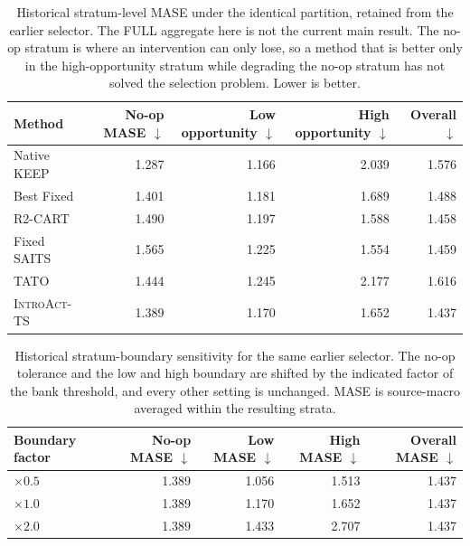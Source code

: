\documentclass{article}
\newcommand{\introact}{\textsc{IntroAct-TS}}
\begin{document}
\begin{table}[htbp]
  \caption{Historical stratum-level MASE under the identical partition, retained from the earlier selector. The FULL aggregate here is not the current main result. The no-op stratum is where an
  intervention can only lose, so a method that is better only in the high-opportunity stratum
  while degrading the no-op stratum has not solved the selection problem. Lower is better.}
  \label{tab:app-opportunity}
  \centering
  \small
  \setlength{\tabcolsep}{4pt}
\begin{tabular*}{\textwidth}{@{\extracolsep{\fill}}lrrrr@{}}
    \toprule
    Method & No-op MASE $\downarrow$ & Low opportunity $\downarrow$ & High opportunity $\downarrow$ & Overall $\downarrow$ \\
    \midrule
    Native KEEP        & 1.287    & 1.166    & 2.039    & 1.576 \\
    Best Fixed         & 1.401      & 1.181      & 1.689      & 1.488 \\
    R2-CART            & 1.490      & 1.197      & 1.588      & 1.458 \\
    Fixed SAITS           & 1.565      & 1.225      & 1.554      & 1.459 \\
    TATO               & 1.444    & 1.245    & 2.177    & 1.616 \\
    \midrule
    \rowcolor{bestgray}\introact{} & 1.389 & 1.170 & 1.652 & 1.437 \\
    \bottomrule
  \end{tabular*}
\end{table}

\begin{table}[htbp]
  \caption{Historical stratum-boundary sensitivity for the same earlier selector. The no-op tolerance and the low and high boundary are
  shifted by the indicated factor of the bank threshold, and every other setting is unchanged.
  MASE is source-macro averaged within the resulting strata.}
  \label{tab:app-opp-sens}
  \centering
  \small
  \setlength{\tabcolsep}{4pt}
\begin{tabular*}{\textwidth}{@{\extracolsep{\fill}}lrrrr@{}}
    \toprule
    Boundary factor & No-op MASE $\downarrow$ & Low MASE $\downarrow$ & High MASE $\downarrow$ & Overall MASE $\downarrow$ \\
    \midrule
    $\times 0.5$ & 1.389  & 1.056  & 1.513  & 1.437 \\
    $\times 1.0$ & 1.389   & 1.170   & 1.652   & 1.437 \\
    $\times 2.0$ & 1.389   & 1.433   & 2.707   & 1.437 \\
    \bottomrule
  \end{tabular*}
\end{table}
\end{document}
